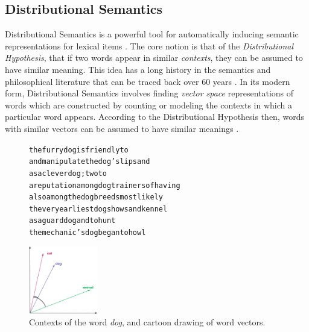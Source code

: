 \documentclass[letterpaper]{article}
\begin{document}
\subsection{Distributional Semantics}
Distributional Semantics is a powerful tool for automatically inducing semantic
representations for lexical items \cite{turney:2010:jair,erk:2012:llc}.  The
core notion is that of the {\em Distributional Hypothesis}, that if two words
appear in similar {\em contexts}, they can be assumed to have similar meaning.
This idea has a long history in the semantics and philosophical literature that
can be traced back over 60 years
\cite{wittgenstein:1953:pi,harris:1954:word,firth:1957:la}. In its modern form,
Distributional Semantics involves finding {\em vector space} representations of
words which are constructed by counting or modeling the contexts in which a
particular word appears. According to the Distributional Hypothesis then, words
with similar vectors can be assumed to have similar meanings
\cite{turney:2010:jair}.

\begin{figure}
\centering
\begin{minipage}{7cm}
\begin{scriptsize}
\begin{alltt}
         the furry {dog} is friendly to
and manipulate the {dog} 's lips and
       as a clever {dog} ; two to
a reputation among {dog} trainers of having
    also among the {dog} breeds most likely
 the very earliest {dog} shows and kennel
        as a guard {dog} and to hunt
   the mechanic 's {dog} began to howl
\end{alltt}
\end{scriptsize}
\end{minipage}\qquad
\begin{minipage}{3cm}
\includegraphics[width=3cm]{figures/vsm}
\end{minipage}
\caption{Contexts of the word {\em dog}, and cartoon drawing
of word vectors.}
\label{fig:vsm}
\end{figure}
\end{document}
